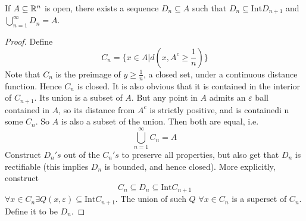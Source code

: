 \documentclass[12pt]{article}
\begin{document}
\begin{lem}
    If $A \subseteq \mathbb{R}^n$ is open, there exists a sequence $D_n \subseteq A$ such that $D_n \subseteq \text{Int} D_{n+1}$ and $\bigcup_{n=1}^\infty D_n = A$.
\end{lem}

\begin{proof}
    Define
    $$C_n = \{x \in A | d(x,A^c \geq \frac{1}{n})\}$$
    Note that $C_n$ is the preimage of $y \geq \frac{1}{n}$, a closed set, under a continuous distance function. Hence $C_n$ is closed. It is also obvious that it is contained in the interior of $C_{n+1}$. Its union is a subset of $A$. But any point in $A$ admits an $\varepsilon$ ball contained in $A$, so its distance from $A^c$ is strictly positive, and is containedi n some $C_n$. So $A$ is also a subset of the union. Then both are equal, i.e.
    $$\bigcup_{n=1}^\infty C_n = A$$
    Construct $D_n's$ out of the $C_n's$ to preserve all properties, but also get that $D_n$ is rectifiable (this implies $D_n$ is bounded, and hence closed). More explicitly, construct
    $$C_n \subseteq D_n \subseteq \text{Int} C_{n+1}$$
    $\forall x \in C_n \exists Q(x,\varepsilon) \subseteq \text{Int} C_{n+1}$. The union of such $Q$ $\forall x \in C_n$ is a superset of $C_n$. Define it to be $D_n$.
\end{proof}
\end{document}
